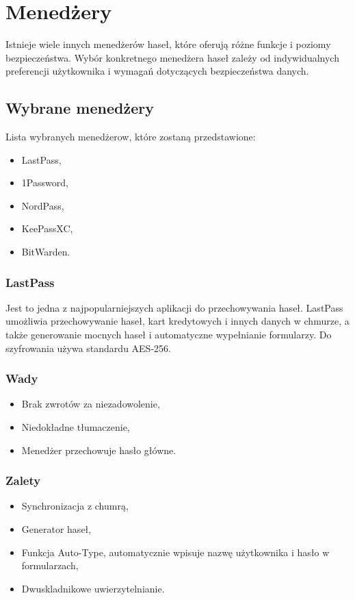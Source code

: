 \section{Menedżery}
Istnieje wiele innych menedżerów haseł, które oferują różne funkcje i poziomy bezpieczeństwa. Wybór konkretnego menedżera haseł zależy od indywidualnych preferencji użytkownika i wymagań dotyczących bezpieczeństwa danych.

\subsection{Wybrane menedżery}
Lista wybranych menedżerow, które zostaną przedstawione:
\begin{itemize}
    \item LastPass,
    \item 1Password,
    \item NordPass,
    \item KeePassXC,
    \item BitWarden.
\end{itemize}

\subsubsection{LastPass}
Jest to jedna z najpopularniejszych aplikacji do przechowywania haseł. LastPass umożliwia przechowywanie haseł, kart kredytowych i innych danych w chmurze, a także generowanie mocnych haseł i automatyczne wypełnianie formularzy. Do szyfrowania używa standardu AES-256.
\subsubsection{Wady}
\begin{itemize}
    \item Brak zwrotów za niezadowolenie,
    \item Niedokładne tłumaczenie,
    \item Menedżer przechowuje hasło główne.
\end{itemize}
\subsubsection{Zalety}
\begin{itemize}
    \item Synchronizacja z chumrą,
    \item Generator haseł,
    \item Funkcja Auto-Type, automatycznie wpisuje nazwę użytkownika i hasło w formularzach,
    \item Dwuskladnikowe uwierzytelnianie.
\end{itemize}

